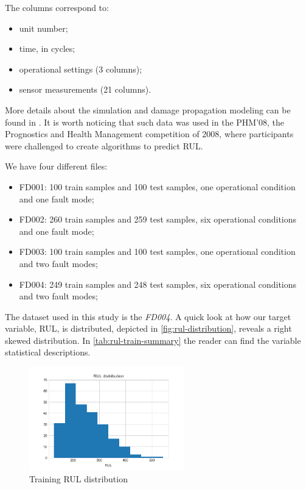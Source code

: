 \documentclass[letterpaper, 10 pt, conference, onecolumn]{ieeeconf}  %
\begin{document}
The columns correspond to:
\begin{itemize}
\item unit number;
\item time, in cycles;
\item operational settings (3 columns);
\item sensor measurements (21 columns).
\end{itemize}

More details about the simulation and damage propagation modeling can be found in \cite{saxena2008damage}. It is worth noticing that such data was used in the PHM'08, the Prognostics and Health Management competition of 2008, where participants were challenged to create algorithms to predict RUL.

We have four different files:

\begin{itemize}
\item FD001: 100 train samples and 100 test samples, one operational condition and one fault mode;
\item FD002: 260 train samples and 259 test samples, six operational conditions and one fault mode;
\item FD003: 100 train samples and 100 test samples, one operational condition and two fault modes;
\item FD004: 249 train samples and 248 test samples, six operational conditions and two fault modes;
\end{itemize}

The dataset used in this study is the \textit{FD004}. A quick look at how our target variable, RUL, is distributed, depicted in \autoref{fig:rul-distribution}, reveals a right skewed distribution. In \autoref{tab:rul-train-summary} the reader can find the variable statistical descriptions.

\begin{figure}[!h]
    \centering
    \includegraphics[width=0.6\textwidth]{plots/eda_rul_distribution.png}
    \caption{Training RUL distribution}
    \label{fig:rul-distribution}
\end{figure}
\end{document}

